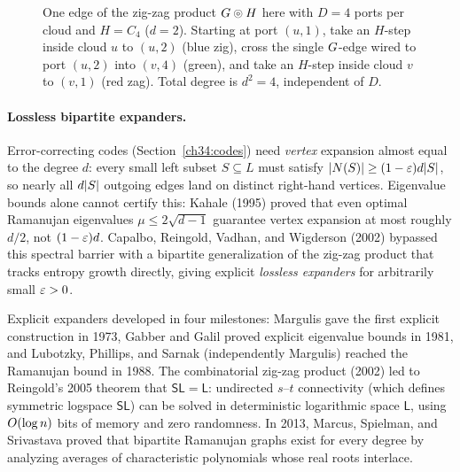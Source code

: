 \begin{figure}[htbp]
\caption{One edge of the zig-zag product $G\mathbin{\circledcirc} H$ here with $D=4$ ports per cloud and $H=C_4$ ($d=2$). Starting at port $(u,1)$, take an $H$-step inside cloud $u$ to $(u,2)$ (blue zig), cross the single $G$-edge wired to port $(u,2)$ into $(v,4)$ (green), and take an $H$-step inside cloud $v$ to $(v,1)$ (red zag). Total degree is $d^2=4$, independent of $D$.}
\label{ch34:fig-zigzag}
\end{figure}

\paragraph{Lossless bipartite expanders.} Error-correcting codes (Section~\ref{ch34:codes}) need \emph{vertex} expansion almost equal to the degree $d$: every small left subset $S\subseteq L$ must satisfy $\lvert N(S)\rvert\ge(1-\varepsilon)d\lvert S\rvert$, so nearly all $d\lvert S\rvert$ outgoing edges land on distinct right-hand vertices. Eigenvalue bounds alone cannot certify this: Kahale (1995) proved that even optimal Ramanujan eigenvalues $\mu\le 2\sqrt{d-1}$ guarantee vertex expansion at most roughly $d/2$, not $(1-\varepsilon)d$. Capalbo, Reingold, Vadhan, and Wigderson (2002) bypassed this spectral barrier with a bipartite generalization of the zig-zag product that tracks entropy growth directly, giving explicit \emph{lossless expanders} for arbitrarily small $\varepsilon>0$.

\begin{marginnotebox}
Explicit expanders developed in four milestones: Margulis gave the first explicit construction in 1973, Gabber and Galil proved explicit eigenvalue bounds in 1981, and Lubotzky, Phillips, and Sarnak (independently Margulis) reached the Ramanujan bound in 1988. The combinatorial zig-zag product (2002) led to Reingold's 2005 theorem that $\mathsf{SL}=\mathsf{L}$: undirected $s$--$t$ connectivity (which defines symmetric logspace $\mathsf{SL}$) can be solved in deterministic logarithmic space $\mathsf{L}$, using $O(\log n)$ bits of memory and zero randomness. In 2013, Marcus, Spielman, and Srivastava proved that bipartite Ramanujan graphs exist for every degree by analyzing averages of characteristic polynomials whose real roots interlace.
\end{marginnotebox}

